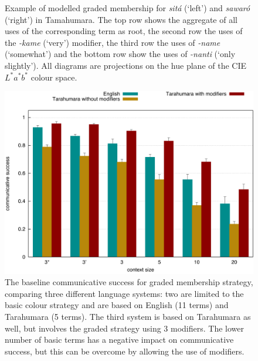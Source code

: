 \begin{figure}[htbp]
{}
\caption[Example of modelled graded membership for Tarahumara]{Example
  of modelled graded membership for \textit{sit\'a} (`left') and \textit{sawar\'o}
  (`right') in Tamahumara. The top row shows the aggregate of all uses
  of the corresponding term as root, the second row the uses of the
  \mbox{\textit{-kame}} (`very') modifier, the third row the uses of \textit{-name}
  (`somewhat') and the bottom row show the uses of \textit{-nanti} (`only
  slightly'). All diagrams are projections on the hue plane of the CIE
  $L^*a^*b^*$ colour space.}
\label{f:gms-baseline-sita-sawaro}
\end{figure}

\begin{figure}
 \centering
  \includegraphics[width=.8\textwidth]{./graded-membership/figures/baseline.pdf}
  \caption[The baseline communicative success for graded membership
  strategy]{The baseline communicative success for graded membership
    strategy, comparing three different language systems: two are
    limited to the basic colour strategy and are based on English (11
    terms) and Tarahumara (5 terms). The third system is based on
    Tarahumara as well, but involves the graded strategy using 3
    modifiers. The lower number of basic terms has a negative impact
    on communicative success, but this can be overcome by allowing the
    use of modifiers.}
  \label{f:gms-baseline}
\end{figure}

